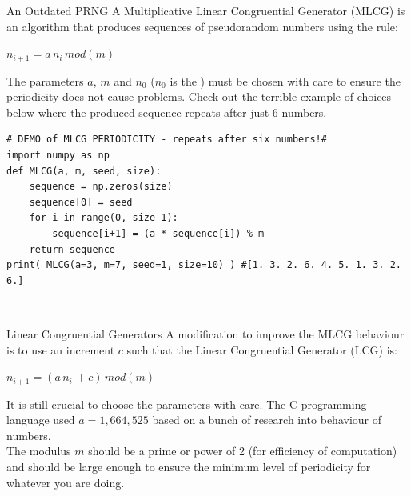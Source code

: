 \documentclass[10pt,sans,english,compress,xcolor=dvipsnames]{beamer}
\begin{document}
\begin{frame}[fragile]{An Outdated PRNG}
\footnotesize
A Multiplicative Linear Congruential\magtn{*} Generator (MLCG)  is an algorithm that produces sequences of pseudorandom numbers using the rule:
\begin{center}
 $n_{i+1} = a\, n_i\, mod(m)$\\[1ex]
 \end{center}
The parameters $a$, $m$ and $n_0$ ($n_0$ is the ) must be chosen with care to ensure the periodicity does not cause problems. Check out the terrible example of choices below where the produced sequence repeats after just 6 numbers.
 \notsotiny
\begin{verbatim}
# DEMO of MLCG PERIODICITY - repeats after six numbers!#
import numpy as np
def MLCG(a, m, seed, size):
    sequence = np.zeros(size)
    sequence[0] = seed
    for i in range(0, size-1):
        sequence[i+1] = (a * sequence[i]) % m
    return sequence
print( MLCG(a=3, m=7, seed=1, size=10) ) #[1. 3. 2. 6. 4. 5. 1. 3. 2. 6.]
\end{verbatim}
 \vspace{0.2cm}
 \footnotesize
{}\\
  
\end{frame} 


\begin{frame}[fragile]{Linear Congruential Generators}
\footnotesize
A modification to improve the MLCG behaviour is to use an increment $c$ such that the Linear Congruential Generator (LCG) is:
\begin{center}
 $n_{i+1} = (a\, n_i\, + c)\, mod(m)$
  \end{center}
 It is still crucial to choose the parameters with care. The C programming language used  $a=1,664,525$  based on a bunch of research into behaviour of numbers. \\[1ex]

The modulus $m$ should be a prime or power of 2 (for efficiency of computation) and should be large enough to ensure the minimum level of periodicity for whatever you are doing.\\[1ex]
 
\end{frame} 
\end{document}
